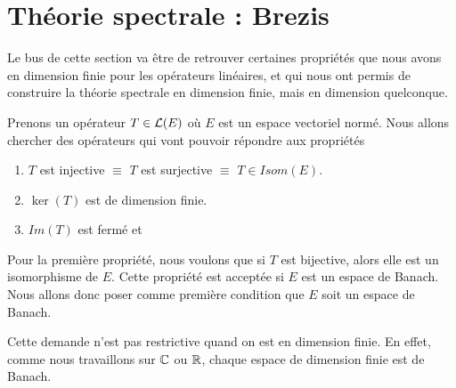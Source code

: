 \section{Théorie spectrale : Brezis}

Le bus de cette section va être de retrouver certaines propriétés que nous avons
en dimension finie pour les opérateurs linéaires, et qui nous ont permis de
construire la théorie spectrale en dimension finie, mais en dimension
quelconque.

Prenons un opérateur $T \in \mathcal{L}(E)$ où $E$ est un espace vectoriel
normé.  Nous allons chercher des opérateurs qui vont pouvoir répondre aux
propriétés

\begin{enumerate}
	\item $T$ est injective $\equiv$ $T$ est surjective $\equiv$ $T \in
		Isom(E)$.
	\item $\ker(T)$ est de dimension finie.
	\item $Im(T)$ est fermé et 
\end{enumerate}

Pour la première propriété, nous voulons que si $T$ est bijective, alors elle
est un isomorphisme de $E$. Cette propriété est acceptée si $E$ est un espace de
Banach. Nous allons donc poser comme première condition que $E$ soit un espace
de Banach.

Cette demande n'est pas restrictive quand on est en dimension finie. En effet,
comme nous travaillons sur $\mathbb{C}$ ou $\mathbb{R}$, chaque espace de dimension
finie est de Banach.
